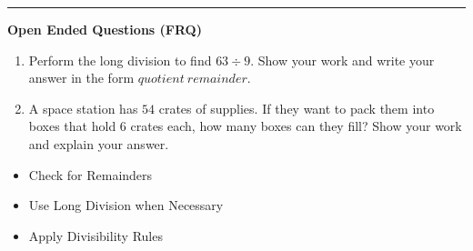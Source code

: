 \documentclass[10pt]{article}
\begin{document}
\vspace{-0.2cm}
\hrule
\vspace{0.2cm}
\textbf{\small Open Ended Questions (FRQ)}
\begin{enumerate}[label=\textbf{Q\arabic*.}, start=9, itemsep=5pt, topsep=0pt]

  \item \small Perform the long division to find $63 \div 9$. Show your work and write your answer in the form $quotient \ remainder$. \vspace{2cm}

  \item \small A space station has $54$ crates of supplies. If they want to pack them into boxes that hold $6$ crates each, how many boxes can they fill? Show your work and explain your answer. \vspace{2cm}

\end{enumerate}

\vfill

\begin{tcolorbox}[colback=blue!5, colframe=mainblue!50, title=\small \textbf{Chef's Tips}, fonttitle=\bfseries, bottom=1mm]
\begin{itemize}[noitemsep, topsep=2pt, leftmargin=0.5cm]
  \item \scriptsize Check for Remainders\item \scriptsize Use Long Division when Necessary\item \scriptsize Apply Divisibility Rules
\end{itemize}
\end{tcolorbox}
\end{document}
